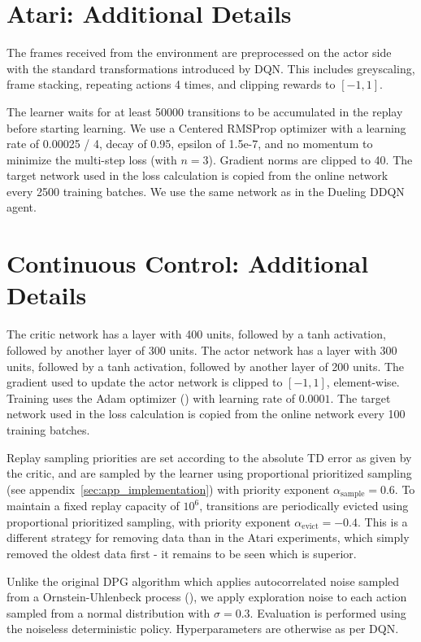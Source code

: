 \documentclass{article} \PassOptionsToPackage{usenames,dvipsnames}{xcolor}
\begin{document}
\section{Atari: Additional Details}
The frames received from the environment are preprocessed on the actor side with the standard transformations introduced by DQN. This includes greyscaling, frame stacking, repeating actions 4 times, and clipping rewards to $[-1, 1]$.

The learner waits for at least 50000 transitions to be accumulated in the replay before starting learning. We use a Centered RMSProp optimizer with a learning rate of 0.00025 / 4, decay of 0.95, epsilon of 1.5e-7, and no momentum to minimize the multi-step loss (with $n=3$). Gradient norms are clipped to 40. The target network used in the loss calculation is copied from the online network every 2500 training batches. We use the same network as in the Dueling DDQN agent.

\section{Continuous Control: Additional Details}

The critic network has a layer with 400 units, followed by a tanh activation, followed by another layer of 300 units. The actor network has a layer with 300 units, followed by a tanh activation, followed by another layer of 200 units. The gradient used to update the actor network is clipped to $[-1, 1]$, element-wise.  Training uses the Adam optimizer (\cite{kingma2014adam}) with learning rate of $0.0001$. The target network used in the loss calculation is copied from the online network every 100 training batches.

Replay sampling priorities are set according to the absolute TD error as given by the critic, and are sampled by the learner using proportional prioritized sampling (see appendix~\ref{sec:app_implementation}) with priority exponent $\alpha_{\mathrm{sample}} = 0.6$. To maintain a fixed replay capacity of $10^{6}$, transitions are periodically evicted using proportional prioritized sampling, with priority exponent $\alpha_{\mathrm{evict}} = -0.4$. This is a different strategy for removing data than in the Atari experiments, which simply removed the oldest data first - it remains to be seen which is superior.

Unlike the original DPG algorithm which applies autocorrelated noise sampled from a Ornstein-Uhlenbeck process (\cite{uhlenbeck1930theory}), we apply exploration noise to each action sampled from a normal distribution with $\sigma = 0.3$. Evaluation is performed using the noiseless deterministic policy. Hyperparameters are otherwise as per DQN.
\end{document}
